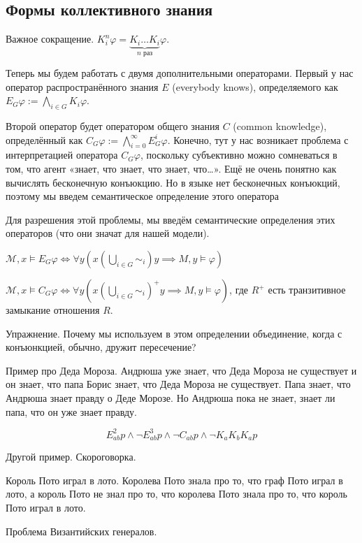 \documentclass[openany]{book}
\theoremstyle{plain}
\theoremstyle{definition}
\begin{document}
\subsection{ Формы коллективного знания }

Важное сокращение. \(K_i^n \varphi = \underbrace{K_i \dots K_i}_{n \text{ раз}} \varphi\).

Теперь мы будем работать с двумя дополнительными операторами. Первый у нас оператор распространённого знания \(E\) (everybody knows), определяемого как  \(E_G \varphi := \bigwedge_{i \in G} K_i \varphi\).

Второй оператор будет оператором общего знания \(C\) (common knowledge), определённый как \(C_G \varphi := \bigwedge_{i=0}^{\infty} E_G^i \varphi\). Конечно, тут у нас возникает проблема с интерпретацией оператора \(C_G \varphi\), поскольку субъективно можно сомневаться в том, что агент «знает, что знает, что знает, что\dots». Ещё не очень понятно как вычислять бесконечную конъюкцию. Но в языке нет бесконечных конъюкций, поэтому мы введем семантическое определение этого оператора

Для разрешения этой проблемы, мы введём семантические определения этих операторов (что они значат для нашей модели).

\(\mathcal{M}, x \models E_G \varphi \Leftrightarrow \forall y (x (\bigcup_{i \in G} \sim_i)y \implies M, y \models \varphi)\)

\(\mathcal{M}, x \models C_G \varphi \Leftrightarrow \forall y (x (\bigcup_{i\in G} \sim_i)^+ y \implies M,y \models \varphi)\), где \(R^+\) есть транзитивное замыкание отношения \(R\).

Упражнение. Почему мы используем в этом определении объединение, когда с конъюнкцией, обычно, дружит пересечение?

Пример про Деда Мороза. Андрюша уже знает, что Деда Мороза не существует и он знает, что папа Борис знает, что Деда Мороза не существует. Папа знает, что Андрюша знает правду о Деде Морозе. Но Андрюша пока не знает, знает ли папа, что он уже знает правду.

\[E^2_{ab} p \land \neg E^3_{ab} p \land \neg C_{ab} p \land \neg K_a K_b K_a p\]

Другой пример. Скороговорка.

Король Пото играл в лото. Королева Пото знала про то, что граф Пото играл в лото, 
а король Пото не знал про то, что королева Пото знала про то, что король Пото играл в лото.

Проблема Византийских генералов.
\end{document}
